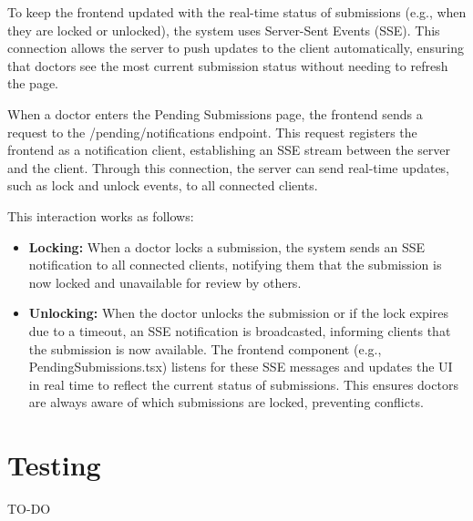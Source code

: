 To keep the frontend updated with the real-time status of submissions (e.g., when they are locked or unlocked), the system uses Server-Sent Events (SSE). This connection allows the server to push updates to the client automatically, ensuring that doctors see the most current submission status without needing to refresh the page.

When a doctor enters the Pending Submissions page, the frontend sends a request to the /pending/notifications endpoint. This request registers the frontend as a notification client, establishing an SSE stream between the server and the client. Through this connection, the server can send real-time updates, such as lock and unlock events, to all connected clients.

This interaction works as follows:
\begin{itemize}
	\item \textbf{Locking:} When a doctor locks a submission, the system sends an SSE notification to all connected clients, notifying them that the submission is now locked and unavailable for review by others.
	\item \textbf{Unlocking:} When the doctor unlocks the submission or if the lock expires due to a timeout, an SSE notification is broadcasted, informing clients that the submission is now available.
	The frontend component (e.g., PendingSubmissions.tsx) listens for these SSE messages and updates the UI in real time to reflect the current status of submissions. This ensures doctors are always aware of which submissions are locked, preventing conflicts.
\end{itemize}
\section{Testing}
TO-DO










